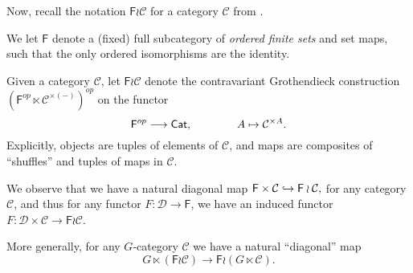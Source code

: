 \documentclass[a4paper,10pt
,draft
]{article}%
\renewcommand{\1}{\eta}%
\begin{document}

Now, recall the notation $\mathsf F \wr \mathcal C$ for a category $\mathcal C$ from \cite{BP_geo}.

\begin{notation}
      \label{F_WR_NOT}
      We let $\mathsf F$ denote a (fixed) full subcategory of \textit{ordered finite sets} and set maps,
      such that the only ordered isomorphisms are the identity.
      
      Given a category $\mathcal C$, let $\mathsf F \wr \mathcal C$ denote the contravariant Grothendieck construction
      $(\mathsf F^{op} \ltimes \mathcal C^{\times (-)})^{op}$ on the functor
      \begin{equation}
            \mathsf F^{op} \longrightarrow \mathsf{Cat},
            \qquad \qquad
            A \mapsto \mathcal C^{\times A}.
      \end{equation}
      Explicitly, objects are tuples of elements of $\mathcal C$, and maps are composites of ``shuffles'' and tuples of maps in $\mathcal C$.
\end{notation}

\begin{remark}
      \label{WR_DIAG_REM}
      We observe that we have a natural diagonal map
      $
      \mathsf F \times \mathcal C \hookrightarrow \mathsf F \wr \mathcal C,
      $
      for any category $\mathcal C$,
      and thus for any functor $F: \mathcal D \to \mathsf F$, we have an induced functor
      $F: \mathcal D \times \mathcal C \to \mathsf F \wr \mathcal C$.

      More generally, for any $G$-category $\mathcal C$ we have a natural ``diagonal'' map
      \begin{equation} 
            G \ltimes (\mathsf F \wr \mathcal C) \to \mathsf F \wr (G \ltimes \mathcal C).
      \end{equation}
\end{remark}
\end{document}
